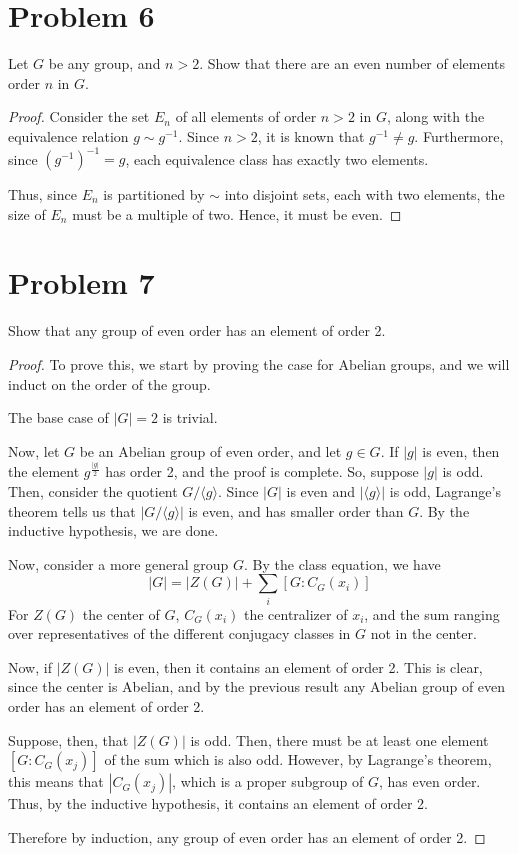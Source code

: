 \documentclass[paper=a4, fontsize=11pt]{scrartcl} %
\numberwithin{equation}{section} %
\numberwithin{figure}{section} %
\numberwithin{table}{section} %
\begin{document}
\section*{Problem 6}
Let $G$ be any group, and $n>2$. Show that there are an even number of elements order $n$ in $G$.
\\
\begin{proof}
Consider the set $E_n$ of all elements of order $n>2$ in $G$, along with the equivalence relation $g\sim g^{-1}$.
Since $n>2$, it is known that $g^{-1}\neq g$. Furthermore, since $(g^{-1})^{-1} = g$, each equivalence class has
exactly two elements.

Thus, since $E_n$ is partitioned by $\sim$ into disjoint sets, each
with two elements, the size of $E_n$ must be a multiple of two. Hence, it must be even.
\end{proof}

\section*{Problem 7}
Show that any group of even order has an element of order 2.
\\
\begin{proof}
To prove this, we start by proving the case for Abelian groups,
and we will induct on the order of the group.

The base case of $|G|=2$ is trivial.

Now, let $G$ be an Abelian group of even order, and let $g\in G$. If $|g|$
is even, then the element $g^{\frac{|g|}{2}}$ has order 2, and the proof is complete.
So, suppose $|g|$ is odd. Then, consider the quotient $G/{\langle g\rangle}$. Since
$|G|$ is even and $|\langle g\rangle|$ is odd, Lagrange's theorem tells us that 
$\left|G/{\langle g\rangle}\right|$ is even, and has smaller order than $G$. By the
inductive hypothesis, we are done. 

Now, consider a more general group $G$.
By the class equation, we have
\[
|G| = |Z(G)| + \sum_i[G:C_G(x_i)]
\]
For $Z(G)$ the center of $G$, $C_G(x_i)$ the centralizer of $x_i$, and the sum ranging over
representatives of the different conjugacy classes in $G$ not in the center.

Now, if $|Z(G)|$ is even, then it contains an element of order 2. This is clear, since 
the center is Abelian, and by the previous result any Abelian group of even order has
an element of order 2.

Suppose, then, that $|Z(G)|$ is odd. Then, there must be at least one element $[G:C_G(x_j)]$
of the sum which is also odd.
However, by Lagrange's theorem, this means that $|C_G(x_j)|$, which is a proper subgroup of $G$,
has even order. Thus, by the inductive hypothesis, it contains an element of order 2.

Therefore by induction, any group of even order has an element of order 2.
\end{proof}
\end{document}
